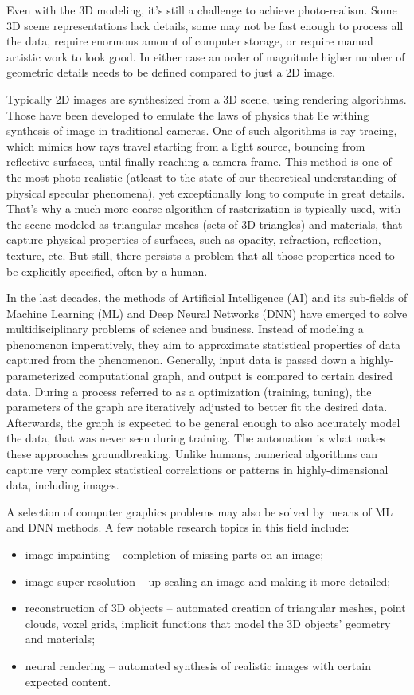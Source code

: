 Even with the 3D modeling, it's still a challenge to achieve photo-realism. Some 3D scene representations lack details, some may not be fast enough to process all the data, require enormous amount of computer storage, or require manual artistic work to look good. In either case an order of magnitude higher number of geometric details needs to be defined compared to just a 2D image. 

Typically 2D images are synthesized from a 3D scene, using rendering algorithms. Those have been developed to emulate the laws of physics that lie withing synthesis of image in traditional cameras. One of such algorithms is ray tracing, which mimics how rays travel starting from a light source, bouncing from reflective surfaces, until finally reaching a camera frame. This method is one of the most photo-realistic (atleast to the state of our theoretical understanding of physical specular phenomena), yet exceptionally long to compute in great details. That's why a much more coarse algorithm of rasterization is typically used, with the scene modeled as triangular meshes (sets of 3D triangles) and materials, that capture physical properties of surfaces, such as opacity, refraction, reflection, texture, etc. But still, there persists a problem that all those properties need to be explicitly specified, often by a human.

In the last decades, the methods of Artificial Intelligence (AI) and its sub-fields of Machine Learning (ML) and Deep Neural Networks (DNN) have emerged to solve multidisciplinary problems of science and business. Instead of modeling a phenomenon imperatively, they aim to approximate statistical properties of data captured from the phenomenon. Generally, input data is passed down a highly-parameterized computational graph, and output is compared to certain desired data. During a process referred to as a optimization (training, tuning), the parameters of the graph are iteratively adjusted to better fit the desired data. Afterwards, the graph is expected to be general enough to also accurately model the data, that was never seen during training. The automation is what makes these approaches groundbreaking. Unlike humans, numerical algorithms can capture very complex statistical correlations or patterns in highly-dimensional data, including images.

A selection of computer graphics problems may also be solved by means of ML and DNN methods. A few notable research topics in this field include:
\begin{itemize}
\item image impainting -- completion of missing parts on an image;
\item image super-resolution -- up-scaling an image and making it more detailed;
\item reconstruction of 3D objects -- automated creation of triangular meshes, point clouds, voxel grids, implicit functions that model the 3D objects' geometry and materials;
\item neural rendering -- automated synthesis of realistic images with certain expected content.
\end{itemize}

